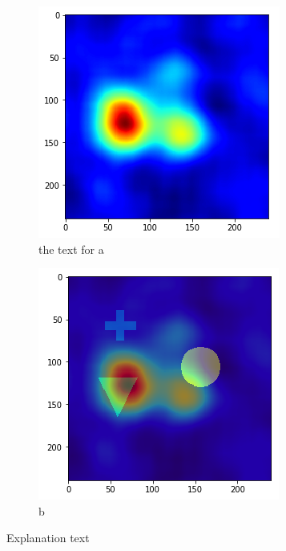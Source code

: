 \begin{figure}[H]
    \centering
    \begin{subfigure}{.5\textwidth}
        \centering
        \includegraphics[width=\linewidth]{chapters/05_testnet/images/rise_2-0.png}
        \caption{ the text for a}
    \end{subfigure}%
    \begin{subfigure}{.5\textwidth}
        \centering
        \includegraphics[width=\linewidth]{chapters/05_testnet/images/rise_2-1.png}
        \caption{b}
    \end{subfigure}
    \caption{Explanation text}
    \label{testnet_rise_max}
\end{figure}



